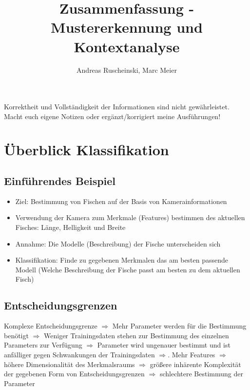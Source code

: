 \documentclass{article} %
\title{Zusammenfassung - Mustererkennung und Kontextanalyse}
\author{
	Andreas Ruscheinski,
	Marc Meier
}
\begin{document}
\maketitle
\begin{framed}Korrektheit und Vollständigkeit der Informationen sind nicht gewährleistet.
Macht euch eigene Notizen oder ergänzt/korrigiert meine Ausführungen!
\end{framed}
\setcounter{tocdepth}{1}
\tableofcontents

\section{Überblick Klassifikation}
	\subsection{Einführendes Beispiel}
	\begin{itemize}
		\item Ziel: Bestimmung von Fischen auf der Basis von Kamerainformationen
		\item Verwendung der Kamera zum Merkmale (Features) bestimmen des aktuellen Fisches: Länge, Helligkeit und Breite
		\item Annahme: Die Modelle (Beschreibung) der Fische unterscheiden sich
		\item Klassifikation: Finde zu gegebenen Merkmalen das am besten passende Modell (Welche Beschreibung der Fische passt am besten zu dem aktuellen Fisch)
	\end{itemize}
	
	\subsection{Entscheidungsgrenzen}
		Komplexe Entscheidungsgrenze $\Rightarrow$ Mehr Parameter werden für die Bestimmung benötigt $\Rightarrow$ Weniger Trainingsdaten stehen zur Bestimmung des einzelnen Parameters zur Verfügung $\Rightarrow$ Parameter wird ungenauer bestimmt und ist anfälliger gegen Schwankungen der Trainingsdaten $\Rightarrow$.
		Mehr Features $\Rightarrow$ höhere Dimensionalität des Merkmalsraums $\Rightarrow$ größere inhärente Komplexität der gegebenen Form von Entscheidungsgrenzen $\Rightarrow$ schlechtere Bestimmung der Parameter
\end{document}
